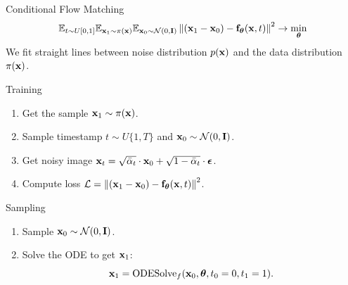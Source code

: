 \begin{frame}{Conditional Flow Matching}
	\vspace{-0.3cm}
	\[
	 \mathbb{E}_{t \sim U[0, 1]} \mathbb{E}_{\mathbf{x}_1 \sim \pi(\mathbf{x})} \mathbb{E}_{\mathbf{x}_0 \sim \mathcal{N}(0, \mathbf{I})}\left\| (\mathbf{x}_1 - \mathbf{x}_0) - \mathbf{f}_{\boldsymbol{\theta}}(\mathbf{x}, t) \right\|^2  \rightarrow \min_{\boldsymbol{\theta}}
	\]
	We fit straight lines between noise distribution $p(\mathbf{x})$ and the data distribution $\pi(\mathbf{x})$.
	\begin{block}{Training}
		\begin{enumerate}
			\item Get the sample $\mathbf{x}_1 \sim \pi(\mathbf{x})$.
			\item Sample timestamp $t \sim U\{1, T\}$ and $\mathbf{x}_0 \sim \mathcal{N}(0, \mathbf{I})$.
			\item Get noisy image $\mathbf{x}_t = \sqrt{\bar{\alpha}_t} \cdot \mathbf{x}_0 + \sqrt{1 - \bar{\alpha}_t} \cdot \boldsymbol{\epsilon}$.
			\item Compute loss $ \mathcal{L} = \left\| (\mathbf{x}_1 - \mathbf{x}_0) - \mathbf{f}_{\boldsymbol{\theta}}(\mathbf{x}, t) \right\|^2 $.
		\end{enumerate}
	\end{block}
	\vspace{-0.3cm}
	\begin{block}{Sampling}
		\begin{enumerate}
			\item Sample $\mathbf{x}_0 \sim \mathcal{N}(0, \mathbf{I})$.
			\item Solve the ODE to get $\mathbf{x}_1$:
			\[
				\mathbf{x}_1 = \text{ODESolve}_f(\mathbf{x}_0, \boldsymbol{\theta}, t_0=0, t_1=1).
			\]
		\end{enumerate}
	\end{block}
\end{frame}
